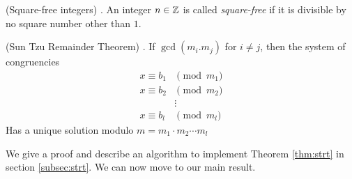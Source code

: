 \documentclass[]{math_paper}
\begin{document}
\begin{definition} (Square-free integers) \cite{Vogt}. An integer $n \in \mathbb{Z}$ is called \emph{square-free} if it is divisible by no square number other than $1$.

\end{definition}

\begin{theorem} (Sun Tzu Remainder Theorem) \label{thm:strt} \cite{Vogt}. If $\gcd(m_i. m_j)$ for $i \neq j$, then the system of congruencies
    \begin{align*}
        x \equiv b_1 & \pmod {m_1} \\
        x \equiv b_2 & \pmod {m_2} \\
                     & \vdots      \\
        x \equiv b_l & \pmod {m_l}
    \end{align*}
    Has a unique solution modulo $m = m_1 \cdot m_2 \cdots m_l$
\end{theorem}
We give a proof and describe an algorithm to implement Theorem \ref{thm:strt} in section \ref{subsec:strt}. We can now move to our main result.
\end{document}
